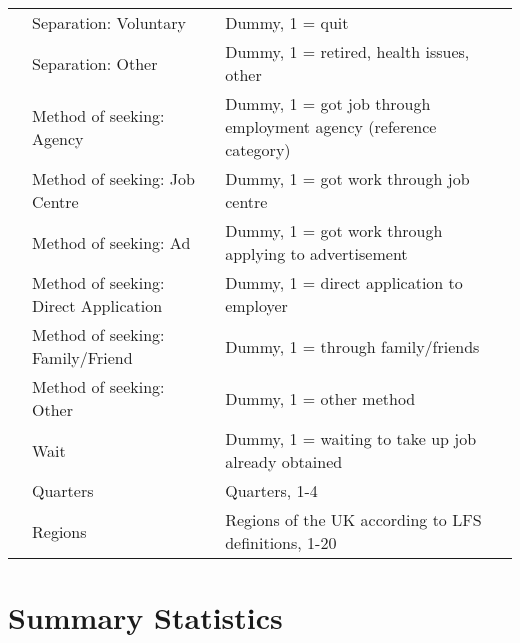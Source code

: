 \documentclass[12pt,authoryear]{elsarticle}
\begin{document}
{\begin{tabular}{l*{1}{ll}}
			& Separation: Voluntary & Dummy, 1 = quit  \\
			& Separation: Other & Dummy, 1 = retired, health issues, other\\
			& Method of seeking: Agency & Dummy, 1 = got job through employment agency (reference category)\\
			& Method of seeking: Job Centre & Dummy, 1 = got work through job centre\\
			& Method of seeking: Ad& Dummy, 1 = got work through applying to advertisement\\
			& Method of seeking: Direct Application & Dummy, 1 = direct application to employer\\
			& Method of seeking: Family/Friend & Dummy, 1 = through family/friends \\
			& Method of seeking: Other & Dummy, 1 = other method\\
			& Wait & Dummy, 1 = waiting to take up job already obtained \\
			& Quarters & Quarters, 1-4 \\
			& Regions & Regions of the UK according to LFS definitions, 1-20 \\
			\hline
			\hline\hline
		\end{tabular}}


	
	\newpage
	\section{Summary Statistics}
	\label{app:SummaryStats}
	
	
	 
	
	
		 
			\vspace{2mm}
	
	 
		\vspace{2mm}
	
	 
	\vspace{2mm}
	
\end{document}
